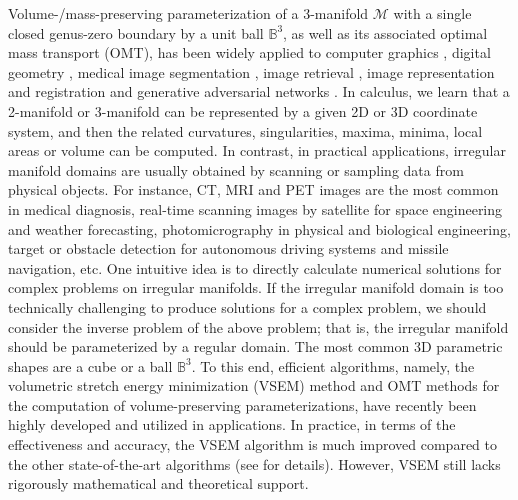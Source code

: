 \documentclass[onefignum,onetabnum]{siamonline220329}
\numberwithin{equation}{section}
\begin{document}
\begin{sloppypar}
Volume-/mass-preserving parameterization of a 3-manifold $\mathcal{M}$ with a single closed genus-zero boundary by a unit ball $\mathbb{B}^3$, as well as its associated optimal mass transport (OMT), has been widely applied to computer graphics \cite{FlHo05}, digital geometry \cite{HoLe07}, medical image segmentation \cite{LiJY21,LiLH22}, image retrieval \cite{li2013,rubner2000}, image representation and registration \cite{HaZT04,kolouri2017,kolouri2016,wang2013} and generative adversarial networks \cite{LeSC19}. In calculus, we learn that a 2-manifold or 3-manifold can be represented by a given 2D or 3D coordinate system, and then the related curvatures, singularities, maxima, minima, local areas or volume can be computed. In contrast, in practical applications, irregular manifold domains are usually obtained by scanning or sampling data from physical objects. For instance, CT, MRI and PET images are the most common in medical diagnosis, real-time scanning images by satellite for space engineering and weather forecasting, photomicrography in physical and biological engineering, target or obstacle detection for autonomous driving systems and missile navigation, etc. One intuitive idea is to directly calculate numerical solutions for complex problems on irregular manifolds. If the irregular manifold domain is too technically challenging to produce solutions for a complex problem, we should consider the inverse problem of the above problem; that is, the irregular manifold should be parameterized by a regular domain. The most common 3D parametric shapes are a cube or a ball $\mathbb{B}^3$. To this end, efficient algorithms, namely, the volumetric stretch energy minimization (VSEM) method \cite{YuLL19} and OMT methods \cite{GuLS16} for the computation of volume-preserving parameterizations, have recently been highly developed and utilized in applications. In practice, in terms of the effectiveness and accuracy, the VSEM algorithm is much improved compared to the other state-of-the-art algorithms (see \cite{YuLL19} for details). However, VSEM still lacks rigorously mathematical and theoretical support.


\end{sloppypar}
\end{document}
